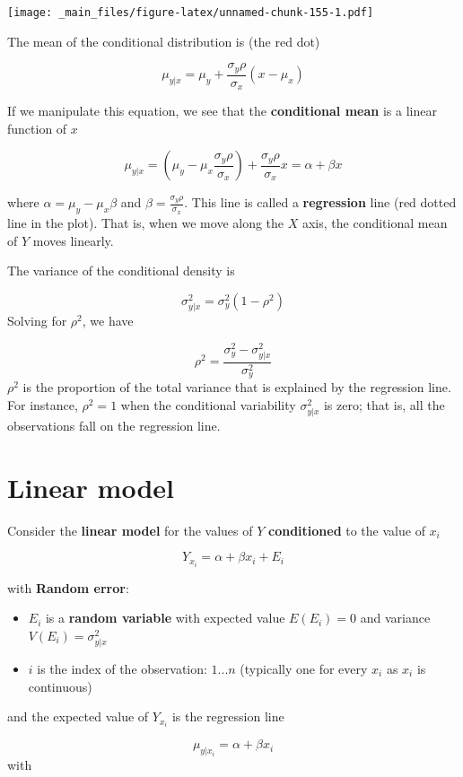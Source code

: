 \documentclass[
]{book}
\begin{document}
\texttt{[image: \_main\_files/figure-latex/unnamed-chunk-155-1.pdf]}

The mean of the conditional distribution is (the red dot)

\[\mu_{y|x}=\mu_y+\frac{\sigma_y\rho}{\sigma_x}(x-\mu_x)\]

If we manipulate this equation, we see that the \textbf{conditional mean} is a linear function of \(x\)

\[\mu_{y|x}=(\mu_y-\mu_x \frac{\sigma_y\rho}{\sigma_x})+\frac{\sigma_y \rho}{\sigma_x} x=\alpha + \beta x\]

where \(\alpha=\mu_y-\mu_x \beta\) and \(\beta=\frac{\sigma_y \rho}{\sigma_x}\). This line is called a \textbf{regression} line (red dotted line in the plot). That is, when we move along the \(X\) axis, the conditional mean of \(Y\) moves linearly.

The variance of the conditional density is

\[\sigma^2_{y|x}= \sigma_y^2(1-\rho^2)\]
Solving for \(\rho^2\), we have

\[\rho^2=\frac{\sigma_y^2-\sigma^2_{y|x}}{\sigma_y^2} \]
\(\rho^2\) is the proportion of the total variance that is explained by the regression line. For instance, \(\rho^2=1\) when the conditional variability \(\sigma^2_{y|x}\) is zero; that is, all the observations fall on the regression line.

\hypertarget{linear-model-3}{%
\section{Linear model}\label{linear-model-3}}

Consider the \textbf{linear model} for the values of \(Y\) \textbf{conditioned} to the value of \(x_i\)

\[Y_{x_i} = \alpha + \beta x_i +E_{i}\]

with \textbf{Random error}:

\begin{itemize}
\item
  \(E_{i}\) is a \textbf{random variable} with expected value \(E(E_{i})=0\) and variance \(V(E_{i})=\sigma_{y|x}^2\)
\item
  \(i\) is the index of the observation: \(1...n\) (typically one for every \(x_i\) as \(x_i\) is continuous)
\end{itemize}

and the expected value of \(Y_{x_i}\) is the regression line

\[\mu_{y|x_i}=\alpha + \beta x_i\]
with
\end{document}
